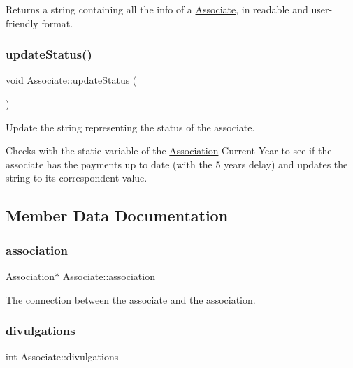 Returns a string containing all the info of a \mbox{\hyperlink{classAssociate}{Associate}}, in readable and user-\/friendly format. 

\mbox{\label{classAssociate_aec791e8d29c2c8ccf9769a6ac49a3af5}} 
\subsubsection{\texorpdfstring{update\+Status()}{updateStatus()}}
{\footnotesize\ttfamily void Associate\+::update\+Status (\begin{DoxyParamCaption}{ }\end{DoxyParamCaption})}



Update the string representing the status of the associate. 

Checks with the static variable of the \mbox{\hyperlink{classAssociation}{Association}} Current Year to see if the associate has the payments up to date (with the 5 years delay) and updates the string to its correspondent value. 

\subsection{Member Data Documentation}
\mbox{\label{classAssociate_a7871837a4c80adb4e39f2f67ae1bfce5}} 
\subsubsection{\texorpdfstring{association}{association}}
{\footnotesize\ttfamily \mbox{\hyperlink{classAssociation}{Association}}$\ast$ Associate\+::association\hspace{0.3cm}{\ttfamily [private]}}



The connection between the associate and the association. 

\mbox{\label{classAssociate_a5f697e757ce7e1be1ed4a2421679b804}} 
\subsubsection{\texorpdfstring{divulgations}{divulgations}}
{\footnotesize\ttfamily int Associate\+::divulgations\hspace{0.3cm}{\ttfamily [private]}}



